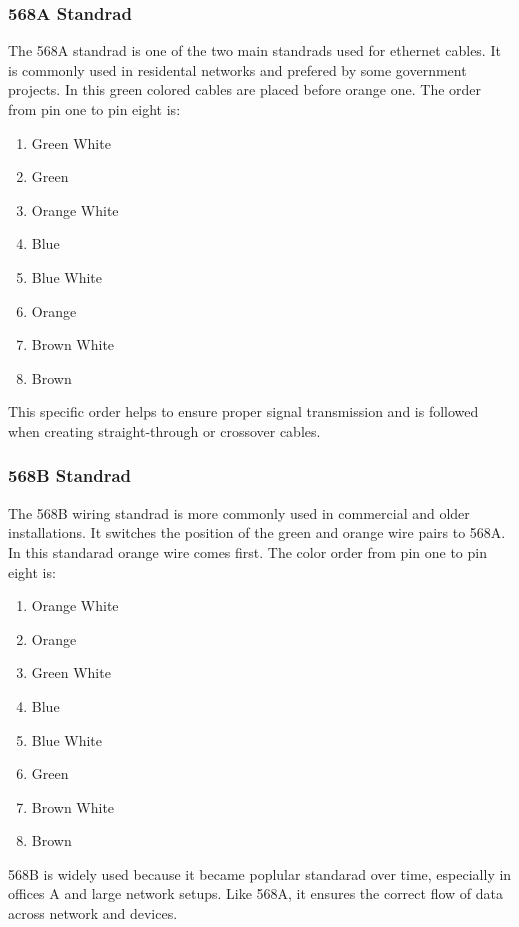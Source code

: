 \documentclass[a4paper]{article}
\begin{document}
\subsubsection{568A Standrad}
The 568A standrad is one of the two main standrads used for ethernet cables. It is commonly used in residental networks and prefered by some government projects. In this green colored cables are placed before orange one. The order from pin one to pin eight is:


\begin{enumerate}
    \item Green White
    \item Green
    \item Orange White
    \item Blue
    \item Blue White
    \item Orange
    \item Brown White
    \item Brown
\end{enumerate}

This specific order helps to ensure proper signal transmission and is followed when creating straight-through or crossover cables.

\subsubsection{568B Standrad}
The 568B wiring standrad is more commonly used in commercial and older installations. It switches the position of the green and orange wire pairs to 568A. In this standarad orange wire comes first. The color order from pin one to pin eight is:

\begin{enumerate}
    \item Orange White
    \item Orange
    \item Green White
    \item Blue
    \item Blue White
    \item Green
    \item Brown White
    \item Brown
\end{enumerate}

568B is widely used because it became poplular standarad over time, especially in offices A and large network setups. Like 568A, it ensures the correct flow of data across network and devices. 
\end{document}
